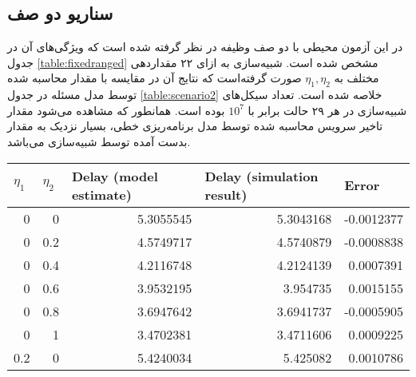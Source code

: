 \subsection{سناریو دو صف}
در این آزمون محیطی با دو صف وظیفه در نظر گرفته شده است که ویژگی‌های آن در جدول \ref{table:fixedranged} مشخص شده است. شبیه‌سازی به ازای ۲۲ مقداردهی مختلف به $\eta_1, \eta_2$ صورت گرفته‌است که نتایج آن در مقایسه با مقدار محاسبه شده توسط مدل مسئله در جدول \ref{table:scenario2} خلاصه شده است. تعداد سیکل‌های شبیه‌سازی در هر ۲۹ حالت برابر با $10^7$ بوده است. همانطور که مشاهده می‌شود مقدار تاخیر سرویس محاسبه شده توسط مدل برنامه‌ریزی خطی، بسیار نزدیک به مقدار بدست آمده توسط شبیه‌سازی می‌باشد.
\begin{table}[]
	\centering
	\begin{latin}
		\begin{tabular}{@{}rrrrr@{}}
			\toprule
			\multicolumn{1}{l}{$\eta_1$} & \multicolumn{1}{l}{$\eta_2$} & \multicolumn{1}{l}{Delay (model estimate)} & \multicolumn{1}{l}{Delay (simulation result)} & \multicolumn{1}{l}{Error} \\ \midrule
			0                        & 0                        & 5.3055545                                  & 5.3043168                                     & -0.0012377                \\
			0                        & 0.2                      & 4.5749717                                  & 4.5740879                                     & -0.0008838                \\
			0                        & 0.4                      & 4.2116748                                  & 4.2124139                                     & 0.0007391                 \\
			0                        & 0.6                      & 3.9532195                                  & 3.954735                                      & 0.0015155                 \\
			0                        & 0.8                      & 3.6947642                                  & 3.6941737                                     & -0.0005905                \\
			0                        & 1                        & 3.4702381                                  & 3.4711606                                     & 0.0009225                 \\
			0.2                      & 0                        & 5.4240034                                  & 5.425082                                      & 0.0010786                 \\

\end{tabular}
\end{latin}
\end{table}
